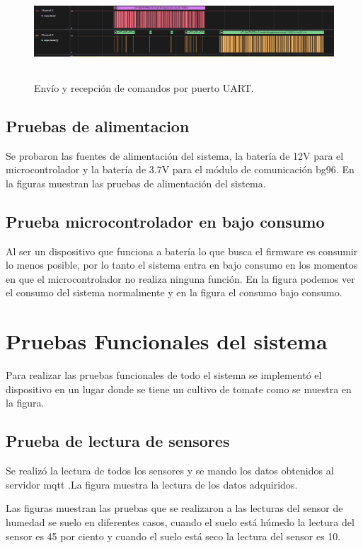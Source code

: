 \begin{figure}[h!]
  \centering
    \includegraphics[width=\linewidth, height=3.5cm]{./Figures/trama_uart1.png}
  \caption{Envío y recepción de comandos por puerto UART.}
    \label{fig:trama uart1}
\end{figure}

\subsection{Pruebas de alimentacion }
Se probaron las fuentes de alimentación del sistema, la batería de 12V para el microcontrolador y la batería de 3.7V para el módulo de comunicación bg96.
En la figuras muestran las pruebas de alimentación del sistema.


\subsection{Prueba microcontrolador en bajo consumo }
Al ser un dispositivo que funciona a batería lo que busca el firmware es consumir lo menos posible, por lo tanto el sistema entra en bajo consumo en los momentos en que el microcontrolador no realiza ninguna función. 
En la figura podemos ver el consumo del sistema normalmente y en la figura el consumo bajo consumo.




\clearpage 
\section{Pruebas Funcionales del sistema}
Para realizar las pruebas funcionales de todo el sistema se implementó el dispositivo en un lugar donde se tiene un cultivo de tomate como se muestra en la figura.

\subsection{Prueba de lectura de sensores}
Se realizó la lectura de todos los sensores y se mando los datos obtenidos al servidor mqtt .La figura muestra la lectura de los datos adquiridos.

Las figuras muestran las pruebas que se realizaron a las lecturas del sensor de humedad se suelo en diferentes casos, cuando el suelo está húmedo la lectura del sensor es  45 por ciento y cuando el suelo está seco la lectura del sensor es 10.

